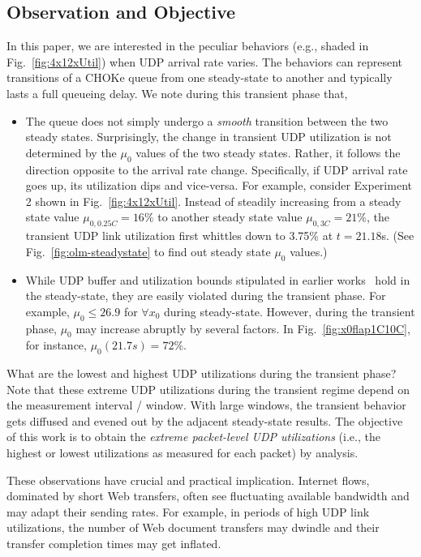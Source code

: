 \documentclass{IEEEtran}
\begin{document}
\subsection{Observation and Objective}\label{subsub:exObservation}
    In this paper, we are interested in the peculiar behaviors  (e.g., shaded in Fig.~\ref{fig:4x12xUtil}) when UDP arrival rate varies. The behaviors can represent transitions of a CHOKe queue from one steady-state to another and typically lasts a full queueing delay. We note during this transient phase that,
    \begin{itemize}
        \item The queue does not simply undergo a \emph{smooth} transition between the two steady states.  Surprisingly, the change in transient UDP utilization is not determined by the $\mu_0$ values of the two steady states. Rather, it follows the direction opposite to the arrival rate change. Specifically, if UDP arrival rate goes up, its utilization dips and vice-versa. For example, consider Experiment 2 shown in Fig.~\ref{fig:4x12xUtil}. Instead of steadily increasing  from a steady state value $\mu_{0,0.25C}=16\%$  to another steady state value $\mu_{0,3C}=21\%$, the transient UDP link utilization first whittles down to 3.75\% at $t=21.18$s. (See Fig.~\ref{fig:olm-steadystate} to find out steady state $\mu_0$ values.)
        \item While UDP buffer and utilization bounds stipulated in earlier works~\cite{ChokeToN04,ChokeSigmetrics03} hold in the steady-state, they are easily violated during the transient phase. For example, $\mu_0 \leq 26.9$ for $\forall x_0$ during steady-state. However, during the transient phase, $\mu_0$ may increase abruptly by several factors. In Fig.~\ref{fig:x0flap1C10C}, for instance, $\mu_0(21.7s)=72\%$.
    \end{itemize}
    What are the lowest and highest UDP utilizations during the transient phase? Note that these extreme UDP utilizations during the transient regime depend on the measurement interval / window. With large windows, the transient behavior gets diffused and evened out by the adjacent steady-state results. The objective of this work is to obtain the \emph{extreme packet-level UDP utilizations} (i.e., the highest or lowest utilizations as measured for each packet) by analysis.

These observations have crucial and practical implication. Internet flows, dominated by short Web transfers, often see fluctuating available bandwidth and may adapt their sending rates.  For example, in periods of high UDP link utilizations, the number of Web document transfers may dwindle and their transfer completion times may get inflated.
\end{document}
